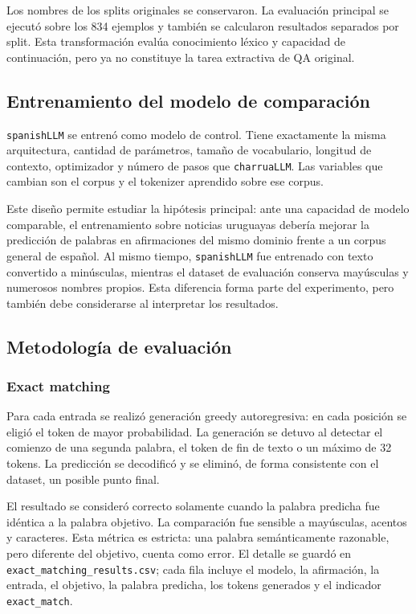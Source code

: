 \documentclass[11pt,a4paper]{article}
\newcommand{\charrua}{\texttt{charruaLLM}}
\newcommand{\spanishmodel}{\texttt{spanishLLM}}
\newcommand{\code}[1]{\texttt{#1}}
\begin{document}
Los nombres de los splits originales se conservaron. La evaluación principal
se ejecutó sobre los 834 ejemplos y también se calcularon resultados separados
por split. Esta transformación evalúa conocimiento léxico y capacidad de
continuación, pero ya no constituye la tarea extractiva de QA original.


\subsection{Entrenamiento del modelo de comparación}

\spanishmodel{} se entrenó como modelo de control. Tiene exactamente la misma
arquitectura, cantidad de parámetros, tamaño de vocabulario, longitud de
contexto, optimizador y número de pasos que \charrua. Las variables que cambian
son el corpus y el tokenizer aprendido sobre ese corpus.

Este diseño permite estudiar la hipótesis principal: ante una capacidad de
modelo comparable, el entrenamiento sobre noticias uruguayas debería mejorar
la predicción de palabras en afirmaciones del mismo dominio frente a un corpus
general de español. Al mismo tiempo, \spanishmodel{} fue entrenado con texto
convertido a minúsculas, mientras el dataset de evaluación conserva mayúsculas
y numerosos nombres propios. Esta diferencia forma parte del experimento, pero
también debe considerarse al interpretar los resultados.


\subsection{Metodología de evaluación}

\subsubsection{Exact matching}

Para cada entrada se realizó generación greedy autoregresiva: en cada posición
se eligió el token de mayor probabilidad. La generación se detuvo al detectar
el comienzo de una segunda palabra, el token de fin de texto o un máximo de 32
tokens. La predicción se decodificó y se eliminó, de forma consistente con el
dataset, un posible punto final.

El resultado se consideró correcto solamente cuando la palabra predicha fue
idéntica a la palabra objetivo. La comparación fue sensible a mayúsculas,
acentos y caracteres. Esta métrica es estricta: una palabra semánticamente
razonable, pero diferente del objetivo, cuenta como error. El detalle se guardó
en \code{exact\_matching\_results.csv}; cada fila incluye el modelo, la
afirmación, la entrada, el objetivo, la palabra predicha, los tokens generados y
el indicador \code{exact\_match}.
\end{document}
